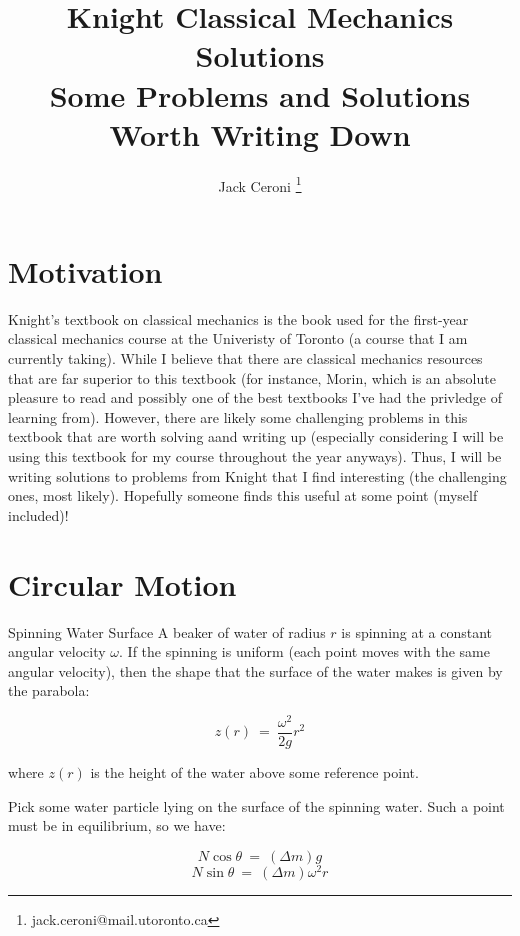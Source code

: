 \documentclass[10pt, oneside]{article}
\title{Knight Classical Mechanics Solutions \\
\large Some Problems and Solutions Worth Writing Down}
\author{Jack Ceroni \thanks{jack.ceroni@mail.utoronto.ca}}
\date{}
\begin{document}
\maketitle
\tableofcontents

\vspace{.25in}

\section{Motivation}

Knight's textbook on classical mechanics is the book used for the first-year classical mechanics course at the Univeristy of 
Toronto (a course that I am currently taking). 
\newline\newline
While I believe that there are classical mechanics resources that are far 
superior to this textbook (for instance, Morin, which is an absolute pleasure to read and possibly one of the best textbooks I've had the privledge of learning from). However, there are likely some challenging problems in this textbook that are worth solving aand writing up (especially considering I will be using this textbook for my course throughout the year anyways). Thus, 
I will be writing solutions to problems from Knight that I find interesting (the challenging ones, most likely). 
\newline\newline
Hopefully someone finds this useful at some point (myself included)!

\section{Circular Motion}

\begin{problem}{Spinning Water Surface}
	A beaker of water of radius $r$ is spinning at a constant angular velocity $\omega$. 
	If the spinning is uniform (each point moves 
	with the same angular velocity), then the shape that the surface of the water makes 
	is given by the parabola:

	$$z(r) \ = \ \frac{\omega^2}{2g} r^2$$

	where $z(r)$ is the height of the water above some reference point.
\end{problem}

Pick some water particle lying on the surface of the spinning water. Such a point must be in equilibrium, so we 
have:

$$N \cos \theta \ = \ (\Delta m)g$$
$$N \sin \theta \ = \ (\Delta m) \omega^2 r$$
\end{document}
